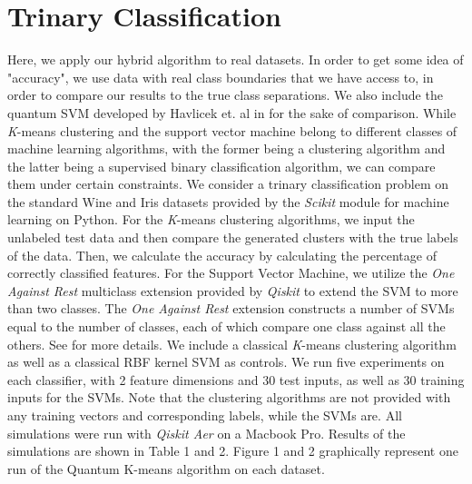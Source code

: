 \documentclass[twocolumn, english]{revtex4-2}
\begin{document}
\section{Trinary Classification}
Here, we apply our hybrid algorithm to real datasets. In order to get some idea of "accuracy", we use data with real class boundaries that we have access to, in order to compare our results to the true class separations. We also include the quantum SVM developed by Havlicek et. al in \cite{qsvm} for the sake of comparison. While \textit{K}-means clustering and the support vector machine belong to different classes of machine learning algorithms, with the former being a clustering algorithm and the latter being a supervised binary classification algorithm, we can compare them under certain constraints. We consider a trinary classification problem on the standard Wine and Iris datasets provided by the \textit{Scikit} module for machine learning on Python. For the \textit{K}-means clustering algorithms, we input the unlabeled test data and then compare the generated clusters with the true labels of the data. Then, we calculate the accuracy by calculating the percentage of correctly classified features. For the Support Vector Machine, we utilize the \textit{One Against Rest} multiclass extension provided by \textit{Qiskit} to extend the SVM to more than two classes. The \textit{One Against Rest} extension constructs a number of SVMs equal to the number of classes, each of which compare one class against all the others. See \cite{multiclass} for more details. We include a classical \textit{K}-means clustering algorithm as well as a classical RBF kernel SVM as controls. We run five experiments on each classifier, with 2 feature dimensions and 30 test inputs, as well as 30 training inputs for the SVMs. Note that the clustering algorithms are not provided with any training vectors and corresponding labels, while the SVMs are. All simulations were run with \textit{Qiskit Aer} on a Macbook Pro. Results of the simulations are shown in Table 1 and 2. Figure 1 and 2 graphically represent one run of the Quantum K-means algorithm on each dataset.
\end{document}
